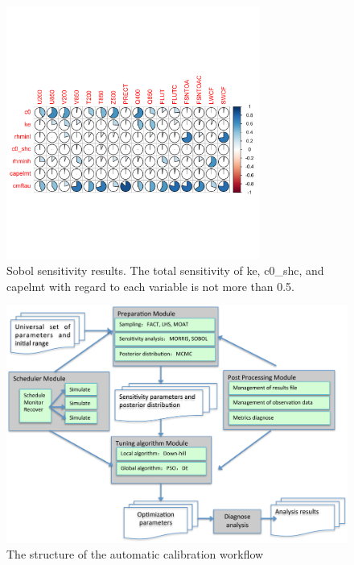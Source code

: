 \documentclass[gmd, manuscript]{copernicus}
\begin{document}
\begin{figure}[t]
\includegraphics[width=8.3cm]{Sobol}
\caption{Sobol sensitivity results. The total sensitivity of ke, c0\_shc, and capelmt with regard to each variable is not more than 0.5.}
\end{figure}

\begin{figure}[t]
\includegraphics[width=15.3cm]{workflow}
\caption{The structure of the automatic calibration workflow}
\end{figure}
\end{document}
